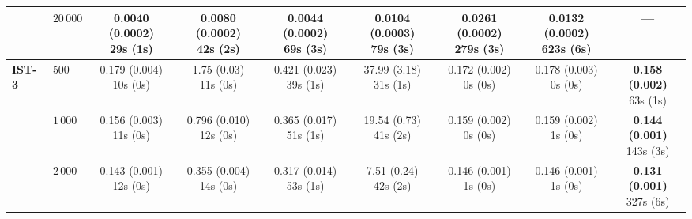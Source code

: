 \begin{table}[htbp]
{\begin{tabular}{llccccccc}
 & $20{\,}000$ & \makecell{\textbf{0.0040 (0.0002)} \\ \scriptsize 29s (1s)} & \makecell{0.0080 (0.0002) \\ \scriptsize 42s (2s)} & \makecell{0.0044 (0.0002) \\ \scriptsize 69s (3s)} & \makecell{0.0104 (0.0003) \\ \scriptsize 79s (3s)} & \makecell{0.0261 (0.0002) \\ \scriptsize 279s (3s)} & \makecell{0.0132 (0.0002) \\ \scriptsize 623s (6s)} & --- \\
\hline
\textbf{IST-3} & $500$ & \makecell{0.179 (0.004) \\ \scriptsize 10s (0s)} & \makecell{1.75 (0.03) \\ \scriptsize 11s (0s)} & \makecell{0.421 (0.023) \\ \scriptsize 39s (1s)} & \makecell{37.99 (3.18) \\ \scriptsize 31s (1s)} & \makecell{0.172 (0.002) \\ \scriptsize 0s (0s)} & \makecell{0.178 (0.003) \\ \scriptsize 0s (0s)} & \makecell{\textbf{0.158 (0.002)} \\ \scriptsize 63s (1s)} \\
 & $1{\,}000$ & \makecell{0.156 (0.003) \\ \scriptsize 11s (0s)} & \makecell{0.796 (0.010) \\ \scriptsize 12s (0s)} & \makecell{0.365 (0.017) \\ \scriptsize 51s (1s)} & \makecell{19.54 (0.73) \\ \scriptsize 41s (2s)} & \makecell{0.159 (0.002) \\ \scriptsize 0s (0s)} & \makecell{0.159 (0.002) \\ \scriptsize 1s (0s)} & \makecell{\textbf{0.144 (0.001)} \\ \scriptsize 143s (3s)} \\
 & $2{\,}000$ & \makecell{0.143 (0.001) \\ \scriptsize 12s (0s)} & \makecell{0.355 (0.004) \\ \scriptsize 14s (0s)} & \makecell{0.317 (0.014) \\ \scriptsize 53s (1s)} & \makecell{7.51 (0.24) \\ \scriptsize 42s (2s)} & \makecell{0.146 (0.001) \\ \scriptsize 1s (0s)} & \makecell{0.146 (0.001) \\ \scriptsize 1s (0s)} & \makecell{\textbf{0.131 (0.001)} \\ \scriptsize 327s (6s)} \\

\end{tabular}}
\end{table}
